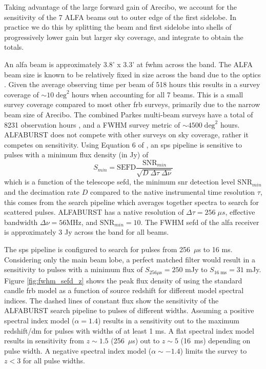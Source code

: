 \documentclass[a4paper,fleqn,usenatbib]{mnras}
\begin{document}
Taking advantage of the large forward gain of Arecibo, we account for
the sensitivity of the 7 ALFA beams out to outer edge of the first
sidelobe. In practice we do this by splitting the beam and first
sidelobe into shells of progressively lower gain but larger sky
coverage, and integrate to obtain the totals.


An \gls{alfa} beam is approximately 3.8' x 3.3' at \gls{fwhm} across
the band.  The ALFA beam size is known to be relatively fixed in size
across the band due to the optics \citep{GALFAbeam}.  Given the
average observing time per beam of 518 hours this results in a survey
coverage of $\sim 10 \; \textrm{deg}^2 \; \textrm{hours}$ when
accounting for all 7 beams. This is a small survey coverage compared
to most other \gls{frb} surveys, primarily due to the narrow beam size
of Arecibo. The combined Parkes multi-beam surveys have a total of
8231 observation hours \citep{2016MNRAS.460.3370C}, and a FWHM survey
metric of $\sim 4500 \; \textrm{deg}^2$ hours.  ALFABURST does not
compete with other surveys on sky coverage, rather it competes on
sensitivity.  Using Equation 6 of \cite{2015MNRAS.452.1254K}, an
\gls{sps} pipeline is sensitive to pulses with a minimum flux density
(in Jy) of
%
\begin{equation}
S_{min} = \textrm{SEFD} \frac{\textrm{SNR}_{min}}{\sqrt{D \; \Delta \tau \;
\Delta \nu}}
\end{equation}
%
which is a function of the telescope \gls{sefd}, the minimum \gls{snr}
detection level $\textrm{SNR}_{min}$ and the decimation rate $D$
compared to the native instrumental time resolution $\tau$, this comes
from the search pipeline which averages together spectra to search for
scattered pulses. ALFABURST has a native resolution of $\Delta \tau =
256 \; \mu s$, effective bandwidth $\Delta \nu = 56 \textrm{MHz}$, and
$\textrm{SNR}_{min} = 10$. The FWHM \gls{sefd} of the \gls{alfa}
receiver is approximately 3 Jy across the band for all beams.


The \gls{sps} pipeline is configured to search for pulses from
256~$\mu$s to 16 ms. Considering only the main beam lobe, a perfect
matched filter would result in a sensitivity to pulses with a minimum
flux of $S_{256 \mu\textrm{s}} = 250$ mJy to $S_{16 \; \textrm{ms}} =
31$ mJy. Figure \ref{fig:fwhm_sefd_z} shows the peak flux density of
using the standard candle \gls{frb} model as a function of source
redshift for different model spectral indices. The dashed lines of
constant flux show the sensitivity of the ALFABURST search pipeline to
pulses of different widths. Assuming a positive spectral index model
($\alpha=1.4$) results in a sensitivity out to the maximum
redshift/\gls{dm} for pulses with widths of at least 1 ms. A flat
spectral index model results in sensitivity from $z \sim 1.5$
(256~$\mu$s) out to $z \sim 5$ (16~ms) depending on pulse width. A
negative spectral index model ($\alpha \sim -1.4$) limits the survey
to $z < 3$ for all pulse widths.
\end{document}
